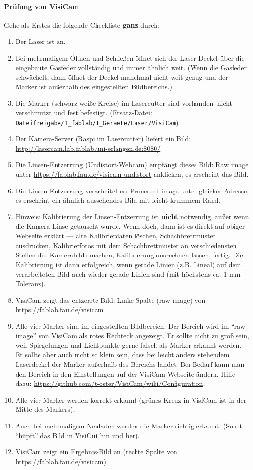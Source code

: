 \documentclass{\basedir/fablab-document}
\begin{document}
	\paragraph{Prüfung von VisiCam} Gehe als Erstes die folgende Checkliste \textbf{ganz} durch:
	\begin{enumerate}
		\item Der Laser ist an.
		\item Bei mehrmaligem Öffnen und Schließen öffnet sich der Laser-Deckel über die eingebaute Gasfeder vollständig und immer ähnlich weit. (Wenn die Gasfeder schwächelt, dann öffnet der Deckel manchmal nicht weit genug und der Marker ist außerhalb des eingestellten Bildbereichs.)
		\item Die Marker (schwarz-weiße Kreise) im Lasercutter sind vorhanden, nicht verschmutzt und fest befestigt. (Ersatz-Datei: \verb|Dateifreigabe/1_fablab/1_Geraete/Laser/VisiCam|)
		\item Der Kamera-Server (Raspi im Lasercutter) liefert ein Bild: \url{http://lasercam.lab.fablab.uni-erlangen.de:8080/}
		\item Die Linsen-Entzerrung (Undistort-Webcam) empfängt dieses Bild: Raw image unter \url{https://fablab.fau.de/visicam-undistort} anklicken, es erscheint das Bild.
		\item Die Linsen-Entzerrung verarbeitet es: Processed image unter gleicher Adresse, es erscheint ein ähnlich aussehendes Bild mit leicht krummem Rand.
		\item Hinweis: Kalibrierung der Linsen-Entzerrung ist \textbf{nicht} notwendig, außer wenn die Kamera-Linse getauscht wurde. Wenn doch, dann ist es direkt auf obiger Webseite erklärt --- alte Kalibrierdaten löschen, Schachbrettmuster ausdrucken, Kalibrierfotos mit dem Schachbrettmuster an verschiedensten Stellen des Kamerabilds machen, Kalibrierung ausrechnen lassen, fertig. Die Kalibrierung ist dann erfolgreich, wenn gerade Linien (z.B. Lineal) auf dem verarbeiteten Bild auch wieder gerade Linien sind (mit höchstens ca. 1 mm Toleranz).
		\item VisiCam zeigt das entzerrte Bild: Linke Spalte (raw image) von \url{https://fablab.fau.de/visicam}
		\item Alle vier Marker sind im eingestellten Bildbereich. Der Bereich wird im \enquote{raw image} von VisiCam als rotes Rechteck angezeigt. Er sollte nicht zu groß sein, weil Spiegelungen und Lichtpunkte gerne falsch als Marker erkannt werden. Er sollte aber auch nicht so klein sein, dass bei leicht anders stehendem Laserdeckel der Marker außerhalb des Bereichs landet. Bei Bedarf kann man den Bereich in den Einstellungen auf der VisiCam-Webseite ändern. Hilfe dazu: \url{https://github.com/t-oster/VisiCam/wiki/Configuration}.
		\item Alle vier Marker werden korrekt erkannt (grünes Kreuz in VisiCam ist in der Mitte des Markers).
		\item Auch bei mehrmaligem Neuladen werden die Marker richtig erkannt. (Sonst \enquote{hüpft} das Bild in VisiCut hin und her).
		\item VisiCam zeigt ein Ergebnis-Bild an (rechte Spalte von \url{https://fablab.fau.de/visicam})
	\end{enumerate}
\end{document}
